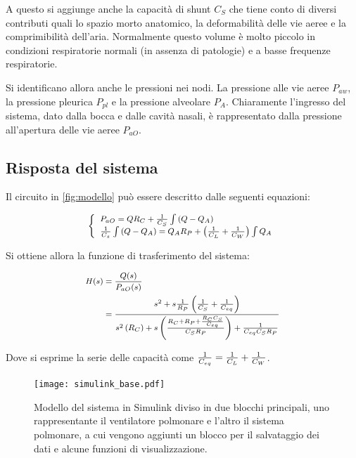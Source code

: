 A questo si aggiunge anche la capacità di shunt $C_S$ che tiene conto di diversi contributi quali lo spazio morto anatomico, la deformabilità delle vie aeree e la comprimibilità dell'aria. Normalmente questo volume è molto piccolo in condizioni respiratorie normali (in assenza di patologie) e a basse frequenze respiratorie.

Si identificano allora anche le pressioni nei nodi. La pressione alle vie aeree $P_{aw}$, la pressione pleurica $P_{pl}$ e la pressione alveolare $P_A$. Chiaramente l'ingresso del sistema, dato dalla bocca e dalle cavità nasali, è rappresentato dalla pressione all'apertura delle vie aeree $P_{aO}$. 



\subsection{Risposta del sistema}

Il circuito in \cref{fig:modello} può essere descritto dalle seguenti equazioni:

\begin{equation}
	\footnotesize{
	\left\{\begin{array}{l}
		P_{a O}=Q R_{C}+\frac{1}{C_{S}} \int\left(Q-Q_{A}\right) \\
		\frac{1}{C_{s}} \int\left(Q-Q_{A}\right)=Q_{A} R_{P}+\left(\frac{1}{C_{L}}+\frac{1}{C_{W}}\right) \int Q_{A}
	\end{array}\right.}
\label{eq:modello}
\end{equation}

Si ottiene allora la funzione di trasferimento del sistema:

\begin{equation}
		\footnotesize{
\begin{aligned}
	H(s)&=\frac{Q(s)}{P_{a O}(s)}\\
	&=\frac{s^{2}+s \frac{1}{R_{P}}\left(\frac{1}{C_{S}}+\frac{1}{C_{e q}}\right)}{s^{2}\left(R_{C}\right)+s\left(\frac{R_{C}+R_{P}+\frac{R_{C} C_{S}}{C_{e q}}}{C_{S} R_{P}}\right)+\frac{1}{C_{e q} C_{S} R_{P}}}
\end{aligned}}
\label{eq:fdt}
\end{equation}

Dove si esprime la serie delle capacità come ${1\over C_{eq}}={1\over C_{L}}+{1\over C_{W}}$. 


\begin{figure}[t!]
	\centering
	\texttt{[image: simulink\_base.pdf]}
	\caption{Modello del sistema in Simulink diviso in due blocchi principali, uno rappresentante il ventilatore polmonare e l'altro il sistema polmonare, a cui vengono aggiunti un blocco per il salvataggio dei dati e alcune funzioni di visualizzazione.}
	\label{fig:generale}
\end{figure}

